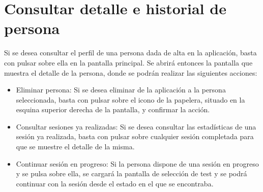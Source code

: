 \section{Consultar detalle e historial de persona}

Si se desea consultar el perfil de una persona dada de alta en la aplicación, basta con pulsar sobre ella en la pantalla principal. Se abrirá entonces la pantalla que muestra el detalle de la persona, donde se podrán realizar las siguientes acciones:

\begin{itemize}
\item Eliminar persona: Si se desea eliminar de la aplicación a la persona seleccionada, basta con pulsar sobre el icono de la papelera, situado en la esquina superior derecha de la pantalla, y confirmar la acción.
\item Consultar sesiones ya realizadas: Si se desea consultar las estadísticas de una sesión ya realizada, basta con pulsar sobre cualquier sesión completada para que se muestre el detalle de la misma.
\item Continuar sesión en progreso: Si la persona dispone de una sesión en progreso y se pulsa sobre ella, se cargará la pantalla de selección de test y se podrá continuar con la sesión desde el estado en el que se encontraba.
\end{itemize}